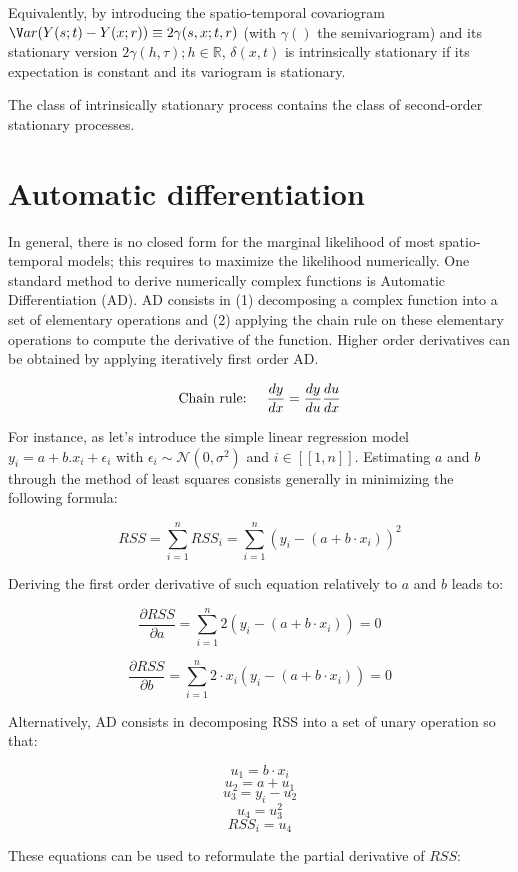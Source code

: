 Equivalently, by introducing the spatio-temporal covariogram $\V ar(Y(s;t) - Y(x;r)) \equiv 2 \gamma(s,x;t,r)$ (with $\gamma()$ the semivariogram) and its stationary version $2\gamma(h,\tau);h\in\mathbb{R}$, $\delta(x,t)$ is intrinsically stationary if its expectation is constant and its variogram is stationary.

The class of intrinsically stationary process contains the class of second-order stationary processes.

\section{Automatic differentiation}\label{appendix:AutoDiff}

In general, there is no closed form for the marginal likelihood of most spatio-temporal models; this requires to maximize the likelihood numerically. One standard method to derive numerically complex functions is Automatic Differentiation (AD). AD consists in (1) decomposing a complex function into a set of elementary operations and (2) applying the chain rule on these elementary operations to compute the derivative of the function. Higher order derivatives can be obtained by applying iteratively first order AD.

$$\text{Chain rule: \quad} \frac{d y}{d x}=\frac{d y}{d u} \frac{d u}{d x}$$

For instance, as \textcite{fournier2012ad} let's introduce the simple linear regression model $y_i=a+b.x_i+\epsilon_i$ with $\epsilon_i \sim \mathcal{N}(0,\sigma^2)$ and $i \in [\![1,n]\!]$. Estimating $a$ and $b$ through the method of least squares consists generally in minimizing the following formula:

$$R S S=\sum_{i=1}^{n} RSS_i=\sum_{i=1}^{n}\left(y_{i}-\left(a+b \cdot x_{i}\right)\right)^{2}$$

Deriving the first order derivative of such equation relatively to $a$ and $b$ leads to:

$$\frac{\partial R S S}{\partial a}=\sum_{i=1}^n 2 (y_i - (a + b \cdot x_i))=0$$

$$\frac{\partial R S S}{\partial b}=\sum_{i=1}^n 2 \cdot x_i (y_i - (a + b \cdot x_i)) =0$$

Alternatively, AD consists in decomposing RSS into a set of unary operation so that:

$$u_{1}=b \cdot x_{i}$$
$$u_{2}=a+u_{1}$$
$$u_{3}=y_{i}-u_{2}$$
$$u_{4}=u_{3}^{2}$$
$$R S S_{i}=u_{4}$$

These equations can be used to reformulate the partial derivative of $RSS$:

